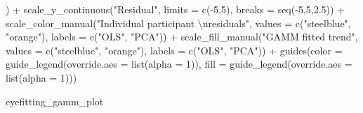 \documentclass[print]{nuthesis}
\newenvironment{Shaded}{\begin{snugshade}}{\end{snugshade}}
\newcommand{\AttributeTok}[1]{\textcolor[rgb]{0.77,0.63,0.00}{#1}}
\newcommand{\DecValTok}[1]{\textcolor[rgb]{0.00,0.00,0.81}{#1}}
\newcommand{\FloatTok}[1]{\textcolor[rgb]{0.00,0.00,0.81}{#1}}
\newcommand{\FunctionTok}[1]{\textcolor[rgb]{0.00,0.00,0.00}{#1}}
\newcommand{\NormalTok}[1]{#1}
\newcommand{\SpecialCharTok}[1]{\textcolor[rgb]{0.00,0.00,0.00}{#1}}
\newcommand{\StringTok}[1]{\textcolor[rgb]{0.31,0.60,0.02}{#1}}
\begin{document}
\begin{Shaded}
\begin{Highlighting}[]
\NormalTok{        ) }\SpecialCharTok{+}
  \FunctionTok{scale\_y\_continuous}\NormalTok{(}\StringTok{"Residual"}\NormalTok{, }\AttributeTok{limits =} \FunctionTok{c}\NormalTok{(}\SpecialCharTok{{-}}\DecValTok{5}\NormalTok{,}\DecValTok{5}\NormalTok{), }\AttributeTok{breaks =} \FunctionTok{seq}\NormalTok{(}\SpecialCharTok{{-}}\DecValTok{5}\NormalTok{,}\DecValTok{5}\NormalTok{,}\FloatTok{2.5}\NormalTok{)) }\SpecialCharTok{+}
  \FunctionTok{scale\_color\_manual}\NormalTok{(}\StringTok{"Individual participant }\SpecialCharTok{\textbackslash{}n}\StringTok{residuals"}\NormalTok{, }\AttributeTok{values =} \FunctionTok{c}\NormalTok{(}\StringTok{"steelblue"}\NormalTok{, }\StringTok{"orange"}\NormalTok{), }\AttributeTok{labels =} \FunctionTok{c}\NormalTok{(}\StringTok{"OLS"}\NormalTok{, }\StringTok{"PCA"}\NormalTok{)) }\SpecialCharTok{+}
  \FunctionTok{scale\_fill\_manual}\NormalTok{(}\StringTok{"GAMM fitted trend"}\NormalTok{, }\AttributeTok{values =} \FunctionTok{c}\NormalTok{(}\StringTok{"steelblue"}\NormalTok{, }\StringTok{"orange"}\NormalTok{), }\AttributeTok{labels =} \FunctionTok{c}\NormalTok{(}\StringTok{"OLS"}\NormalTok{, }\StringTok{"PCA"}\NormalTok{))   }\SpecialCharTok{+}
  \FunctionTok{guides}\NormalTok{(}\AttributeTok{color =} \FunctionTok{guide\_legend}\NormalTok{(}\AttributeTok{override.aes =} \FunctionTok{list}\NormalTok{(}\AttributeTok{alpha =} \DecValTok{1}\NormalTok{)),}
         \AttributeTok{fill =} \FunctionTok{guide\_legend}\NormalTok{(}\AttributeTok{override.aes =} \FunctionTok{list}\NormalTok{(}\AttributeTok{alpha =} \DecValTok{1}\NormalTok{)))}

\NormalTok{eyefitting\_gamm\_plot}
\end{Highlighting}
\end{Shaded}
\end{document}
